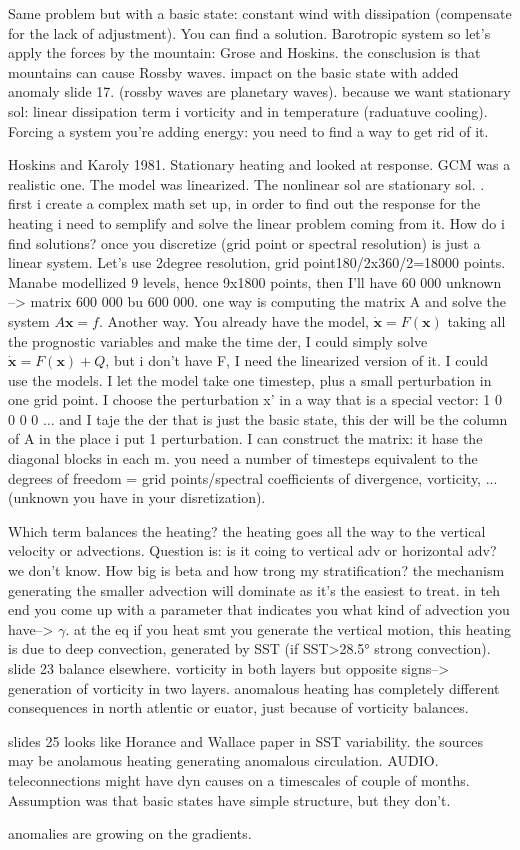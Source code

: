 Same problem but with a basic state: constant wind with dissipation (compensate for the lack of adjustment). You can find a solution. Barotropic system so let's apply the forces by the mountain: Grose and Hoskins. the consclusion is that mountains can cause Rossby waves. impact on the basic state with added anomaly slide 17.
(rossby waves are planetary waves).
because we want stationary sol: linear dissipation term i vorticity and in temperature (raduatuve cooling). Forcing a system you're adding energy: you need to find a way to get rid of it.

Hoskins and Karoly 1981. Stationary heating and looked at response. GCM was a realistic one. The model was linearized. The nonlinear sol are stationary sol. . first i create a complex math set up, in order to find out the response for the heating i need to semplify and solve the linear problem coming from it. How do i find solutions? once you discretize (grid point or spectral resolution) is just a linear system.  Let's use 2degree resolution, grid point180/2x360/2=18000 points. Manabe modellized 9 levels, hence 9x1800 points, then I'll have 60 000 unknown --> matrix 600 000 bu 600 000. one way is computing the matrix A and solve the system $A\mathbf{x}=f$. Another way. You already have the model, $\mathbf{\dot{x}}=F(\mathbf{x})$ taking all the prognostic variables and make the time der, I could simply solve $\mathbf{\dot{x}}=F(\mathbf{x})+Q$, but i don't have F, I need the linearized version of it. I could use the models. I let the model take one timestep, plus a small perturbation in one grid point. I choose the perturbation x' in a way that is a special vector: 1 0 0 0 0 ... and I taje the der that is just the basic state, this der will be the column of A in the place i put 1 perturbation. I can construct the matrix: it hase the diagonal blocks in each m. you need a number of timesteps equivalent to the degrees of freedom = grid points/spectral coefficients of divergence, vorticity, ... (unknown you have in your disretization).



Which term balances the heating? the heating goes all the way to the vertical velocity or advections. Question is: is it coing to vertical adv or horizontal adv? we don't know. How big is beta and how trong my stratification? the mechanism generating the smaller advection will dominate as it's the easiest to treat. in teh end you come up with a parameter that indicates you what kind of advection you have--> $\gamma$.  at the eq if you heat smt you generate the vertical motion, this heating is due to deep convection, generated by SST  (if SST>28.5° strong convection).
slide 23 balance elsewhere.  vorticity in both layers but opposite signs--> generation of vorticity in two layers. anomalous heating has completely different consequences in north atlentic or euator, just because of vorticity balances.

slides 25 looks like Horance and Wallace paper in SST variability. the sources may be anolamous heating generating anomalous circulation. AUDIO. teleconnections might have dyn causes on a timescales of couple of months.
Assumption was that basic states have simple structure, but they don't.

anomalies are growing on the gradients.